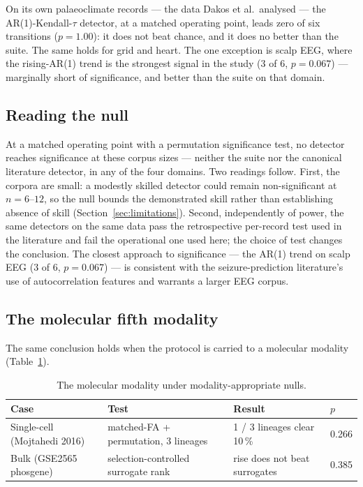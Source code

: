 \documentclass[11pt]{article}
\begin{document}
On its own palaeoclimate records --- the data Dakos et al.\ analysed
--- the AR(1)-Kendall-$\tau$ detector, at a matched operating point,
leads zero of six transitions ($p = 1.00$): it does not beat chance,
and it does no better than the suite. The same holds for grid and
heart. The one exception is scalp EEG, where the rising-AR(1) trend is
the strongest signal in the study (3 of 6, $p = 0.067$) --- marginally
short of significance, and better than the suite on that domain.

\subsection{Reading the null}\label{sec:reading}

At a matched operating point with a permutation significance test, no
detector reaches significance at these corpus sizes --- neither the
suite nor the canonical literature detector, in any of the four
domains. Two readings follow. First, the corpora are small: a modestly
skilled detector could remain non-significant at $n = 6$--$12$, so the
null bounds the demonstrated skill rather than establishing absence of
skill (Section~\ref{sec:limitations}). Second, independently of power,
the same detectors on the same data pass the retrospective per-record
test used in the literature and fail the operational one used here; the
choice of test changes the conclusion. The closest approach to
significance --- the AR(1) trend on scalp EEG (3 of 6, $p = 0.067$) ---
is consistent with the seizure-prediction literature's use of
autocorrelation features and warrants a larger EEG corpus.

\subsection{The molecular fifth modality}\label{sec:dnb}

The same conclusion holds when the protocol is carried to a molecular
modality (Table~\ref{tab:dnb}).

\begin{table}[h!]
\centering
\footnotesize
\setlength{\tabcolsep}{4pt}
\begin{tabular}{llll}
\toprule
Case & Test & Result & $p$ \\
\midrule
Single-cell (Mojtahedi 2016) & matched-FA + permutation, 3 lineages & 1 / 3 lineages clear 10\,\% & 0.266 \\
Bulk (GSE2565 phosgene) & selection-controlled surrogate rank & rise does not beat surrogates & 0.385 \\
\bottomrule
\end{tabular}
\caption{The molecular modality under modality-appropriate nulls.}
\label{tab:dnb}
\end{table}
\end{document}
